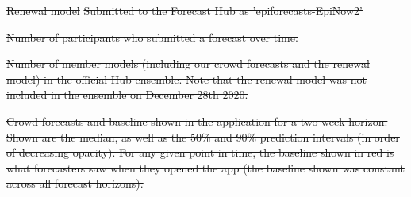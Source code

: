 \documentclass[10pt,letterpaper]{article}
\providecommand{\DIFdeltex}[1]{{\protect\color{red}\sout{#1}}}                      %
\providecommand{\DIFdelFL}[1]{\DIFdel{#1}} %
\providecommand{\DIFdel}[1]{\texorpdfstring{\DIFdeltex{#1}}{}} %
\begin{document}
\DIFdel{Renewal model }%
\DIFdel{Submitted to the Forecast Hub as 'epiforecasts-EpiNow2'}%

{%
\DIFdelFL{Number of participants who submitted a forecast over time.}}%

{%
\DIFdelFL{Number of member models (including our crowd forecasts and the renewal model) in the official Hub ensemble. Note that the renewal model was not included in the ensemble on December 28th 2020.}}%



{%
\DIFdelFL{Crowd forecasts and baseline shown in the application for a two week horizon. Shown are the median, as well as the 50\% and 90\% prediction intervals (in order of decreasing opacity). For any given point in time, the baseline shown in red is what forecasters saw when they opened the app (the baseline shown was constant across all forecast horizons).}}%
\end{document}
